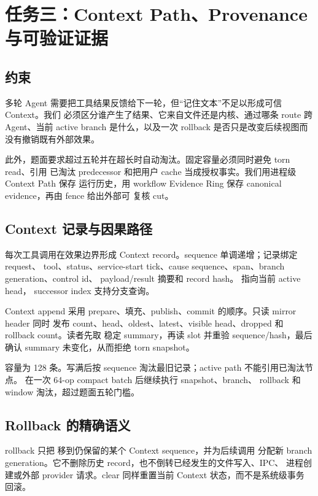 \chapter{任务三：Context Path、Provenance 与可验证证据}
\label{chap:task3}

\section{约束}

多轮 Agent 需要把工具结果反馈给下一轮，但“记住文本”不足以形成可信 Context。我们
必须区分谁产生了结果、它来自文件还是内核、通过哪条 route 跨 Agent、当前 active
branch 是什么，以及一次 rollback 是否只是改变后续视图而没有撤销既有外部效果。

此外，题面要求超过五轮并在超长时自动淘汰。固定容量必须同时避免 torn read、引用
已淘汰 predecessor 和把用户 cache 当成授权事实。我们用进程级 Context Path 保存
运行历史，用 workflow Evidence Ring 保存 canonical evidence，再由 fence 给出外部可
复核 cut。

\section{Context 记录与因果路径}

每次工具调用在效果边界形成 Context record。sequence 单调递增；记录绑定 request、
tool、status、service-start tick、cause sequence、span、branch generation、control id、
payload/result 摘要和 record hash。 指向当前 active head，
successor index 支持分支查询。

Context append 采用 prepare、填充、publish、commit 的顺序。只读 mirror header 同时
发布 count、head、oldest、latest、visible head、dropped 和 rollback count。读者先取
稳定 summary，再读 slot 并重验 sequence/hash，最后确认 summary 未变化，从而拒绝
torn snapshot。

容量为 128 条。写满后按 sequence 淘汰最旧记录；active path 不能引用已淘汰节点。
 在一次 64-op compact batch 后继续执行 snapshot、branch、
rollback 和 window 淘汰，超过题面五轮门槛。

\section{Rollback 的精确语义}

rollback 只把  移到仍保留的某个 Context sequence，并为后续调用
分配新 branch generation。它不删除历史 record，也不倒转已经发生的文件写入、IPC、
进程创建或外部 provider 请求。clear 同样重置当前 Context 状态，而不是系统级事务
回滚。

